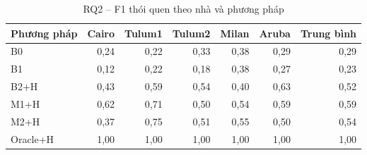 \begin{table}[htbp]
\centering
\caption{RQ2 -- F1 thói quen theo nhà và phương pháp}
\label{tab:rq2-f1}
\small
\begin{tabular}{lrrrrrr}
\toprule
Phương pháp & Cairo & Tulum1 & Tulum2 & Milan & Aruba & Trung bình \\
\midrule
B0 & 0{,}24 & 0{,}22 & 0{,}33 & 0{,}38 & 0{,}29 & 0{,}29 \\
B1 & 0{,}12 & 0{,}22 & 0{,}18 & 0{,}38 & 0{,}27 & 0{,}23 \\
B2+H & 0{,}43 & 0{,}59 & 0{,}54 & 0{,}40 & 0{,}63 & 0{,}52 \\
M1+H & 0{,}62 & 0{,}71 & 0{,}50 & 0{,}54 & 0{,}59 & 0{,}59 \\
M2+H & 0{,}37 & 0{,}75 & 0{,}51 & 0{,}55 & 0{,}50 & 0{,}54 \\
Oracle+H & 1{,}00 & 1{,}00 & 1{,}00 & 1{,}00 & 1{,}00 & 1{,}00 \\
\bottomrule
\end{tabular}
\end{table}

